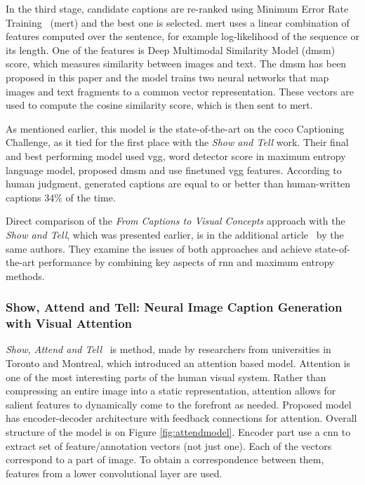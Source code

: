 In the third stage, candidate captions are re-ranked using Minimum Error Rate Training~\cite{och2003minimum} (\gls{mert}) and the best one is selected. \gls{mert} uses a linear combination of features computed over the sentence, for example log-likelihood of the sequence or its length. One of the features is Deep Multimodal Similarity Model (\gls{dmsm}) score, which measures similarity between images and text. The \gls{dmsm} has been proposed in this paper and the model trains two neural networks that map images and text fragments to a common vector representation. These vectors are used to compute the cosine similarity score, which is then sent to \gls{mert}.

As mentioned earlier, this model is the state-of-the-art on the \gls{coco} Captioning Challenge, as it tied for the first place with the \emph{Show and Tell} work. Their final and best performing model used \gls{vgg}, word detector score in maximum entropy language model, proposed \gls{dmsm} and use finetuned \gls{vgg} features. According to human judgment, generated captions are equal to or better than human-written captions 34\% of the time.

Direct comparison of the \emph{From Captions to Visual Concepts} approach with the \emph{Show and Tell}, which was presented earlier, is in the additional article~\cite{DBLP:journals/corr/DevlinCFGDHZM15} by the same authors. They examine the issues of both approaches and achieve state-of-the-art performance by combining key aspects of \gls{rnn} and maximum entropy methods.

\subsubsection{Show, Attend and Tell: Neural Image Caption Generation with Visual Attention}

\emph{Show, Attend and Tell}~\cite{DBLP:journals/corr/XuBKCCSZB15} is method, made by researchers from universities in Toronto and Montreal, which introduced an attention based model. Attention is one of the most interesting parts of the human visual system. Rather than compressing an entire image into a static representation, attention allows for salient features to dynamically come to the forefront as needed. Proposed model has encoder-decoder architecture with feedback connections for attention. Overall structure of the model is on Figure \ref{fig:attendmodel}. Encoder part use a \gls{cnn} to extract set of feature/annotation vectors (not just one). Each of the vectors correspond to a part of image. To obtain a correspondence between them, features from a lower convolutional layer are used.

